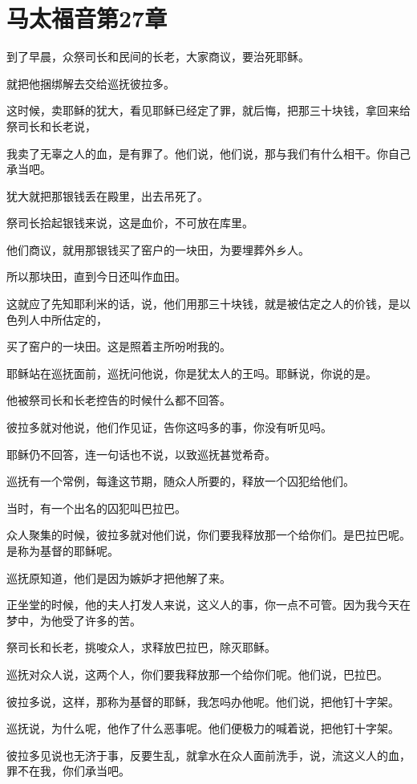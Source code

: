 \documentclass[12pt,oneside]{book}
\begin{document}
\chapter{马太福音第27章}
到了早晨，众祭司长和民间的长老，大家商议，要治死耶稣。

就把他捆绑解去交给巡抚彼拉多。

这时候，卖耶稣的犹大，看见耶稣已经定了罪，就后悔，把那三十块钱，拿回来给祭司长和长老说，

我卖了无辜之人的血，是有罪了。他们说，他们说，那与我们有什么相干。你自己承当吧。

犹大就把那银钱丢在殿里，出去吊死了。

祭司长拾起银钱来说，这是血价，不可放在库里。

他们商议，就用那银钱买了窑户的一块田，为要埋葬外乡人。

所以那块田，直到今日还叫作血田。

这就应了先知耶利米的话，说，他们用那三十块钱，就是被估定之人的价钱，是以色列人中所估定的，

买了窑户的一块田。这是照着主所吩咐我的。

耶稣站在巡抚面前，巡抚问他说，你是犹太人的王吗。耶稣说，你说的是。

他被祭司长和长老控告的时候什么都不回答。

彼拉多就对他说，他们作见证，告你这吗多的事，你没有听见吗。

耶稣仍不回答，连一句话也不说，以致巡抚甚觉希奇。

巡抚有一个常例，每逢这节期，随众人所要的，释放一个囚犯给他们。

当时，有一个出名的囚犯叫巴拉巴。

众人聚集的时候，彼拉多就对他们说，你们要我释放那一个给你们。是巴拉巴呢。是称为基督的耶稣呢。

巡抚原知道，他们是因为嫉妒才把他解了来。

正坐堂的时候，他的夫人打发人来说，这义人的事，你一点不可管。因为我今天在梦中，为他受了许多的苦。

祭司长和长老，挑唆众人，求释放巴拉巴，除灭耶稣。

巡抚对众人说，这两个人，你们要我释放那一个给你们呢。他们说，巴拉巴。

彼拉多说，这样，那称为基督的耶稣，我怎吗办他呢。他们说，把他钉十字架。

巡抚说，为什么呢，他作了什么恶事呢。他们便极力的喊着说，把他钉十字架。

彼拉多见说也无济于事，反要生乱，就拿水在众人面前洗手，说，流这义人的血，罪不在我，你们承当吧。
\end{document}
